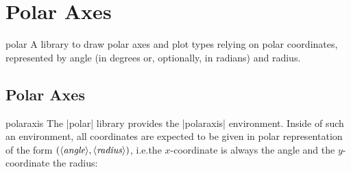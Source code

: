 
\section[libs.polar]{Polar Axes}
\label{sec:polar}

{
\def\pgfplotsmanualcurlibrary{polar}

\begin{pgfplotslibrary}{polar}
    A library to draw polar axes and plot types relying on polar coordinates,
    represented by angle (in degrees or, optionally, in radians) and radius.
\end{pgfplotslibrary}


\subsection{Polar Axes}

\begin{environment}{{polaraxis}}
    The |polar| library provides the |polaraxis| environment.
    Inside of such an environment, all coordinates are expected to be given in
    polar representation of the form $(\langle\textit{angle}\rangle,\langle\textit{radius}\rangle)$, i.e.\@ the
    $x$-coordinate is always the angle and the $y$-coordinate the radius:
\end{environment}

\begin{codeexample}[]
\end{codeexample}

\begin{codeexample}[]
\end{codeexample}

\begin{codeexample}[]
\end{codeexample}

}

